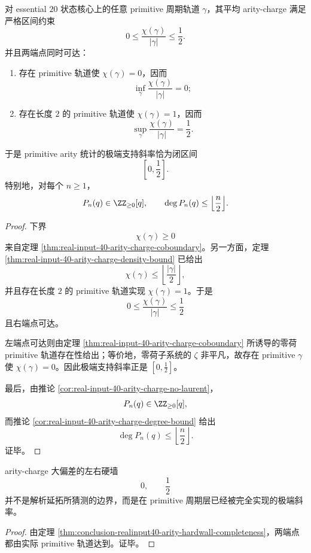 \begin{theorem}\label{thm:conclusion-realinput40-arity-hardwall-completeness}
对 essential \(20\) 状态核心上的任意 primitive 周期轨道 \(\gamma\)，其平均 arity-charge 满足严格区间约束
\[
0\le \frac{\chi(\gamma)}{|\gamma|}\le \frac12.
\]
并且两端点同时可达：
\begin{enumerate}
  \item 存在 primitive 轨道使 \(\chi(\gamma)=0\)，因而
  \[
  \inf_\gamma \frac{\chi(\gamma)}{|\gamma|}=0;
  \]
  \item 存在长度 \(2\) 的 primitive 轨道使 \(\chi(\gamma)=1\)，因而
  \[
  \sup_\gamma \frac{\chi(\gamma)}{|\gamma|}=\frac12.
  \]
\end{enumerate}
于是 primitive arity 统计的极端支持斜率恰为闭区间
\[
\left[0,\frac12\right].
\]
特别地，对每个 \(n\ge 1\)，
\[
P_n(q)\in \ZZ_{\ge 0}[q],
\qquad
\deg P_n(q)\le \Bigl\lfloor\frac{n}{2}\Bigr\rfloor.
\]
\end{theorem}
\begin{proof}
下界
\[
\chi(\gamma)\ge 0
\]
来自定理 \ref{thm:real-input-40-arity-charge-coboundary}。另一方面，定理 \ref{thm:real-input-40-arity-charge-density-bound} 已给出
\[
\chi(\gamma)\le \left\lfloor\frac{|\gamma|}{2}\right\rfloor,
\]
并且存在长度 \(2\) 的 primitive 轨道实现 \(\chi(\gamma)=1\)。于是
\[
0\le \frac{\chi(\gamma)}{|\gamma|}\le \frac12
\]
且右端点可达。

左端点可达则由定理 \ref{thm:real-input-40-arity-charge-coboundary} 所诱导的零荷 primitive 轨道存在性给出；等价地，零荷子系统的 \(\zeta\) 非平凡，故存在 primitive \(\gamma\) 使 \(\chi(\gamma)=0\)。因此极端支持斜率正是 \([0,\frac12]\)。

最后，由推论 \ref{cor:real-input-40-arity-charge-no-laurent}，
\[
P_n(q)\in \ZZ_{\ge 0}[q],
\]
而推论 \ref{cor:real-input-40-arity-charge-degree-bound} 给出
\[
\deg P_n(q)\le \left\lfloor\frac{n}{2}\right\rfloor.
\]
证毕。
\end{proof}

\begin{corollary}\label{cor:conclusion-realinput40-arity-hardwalls-realized}
arity-charge 大偏差的左右硬墙
\[
0,\qquad \frac12
\]
并不是解析延拓所猜测的边界，而是在 primitive 周期层已经被完全实现的极端斜率。
\end{corollary}
\begin{proof}
由定理 \ref{thm:conclusion-realinput40-arity-hardwall-completeness}，两端点都由实际 primitive 轨道达到。证毕。
\end{proof}


